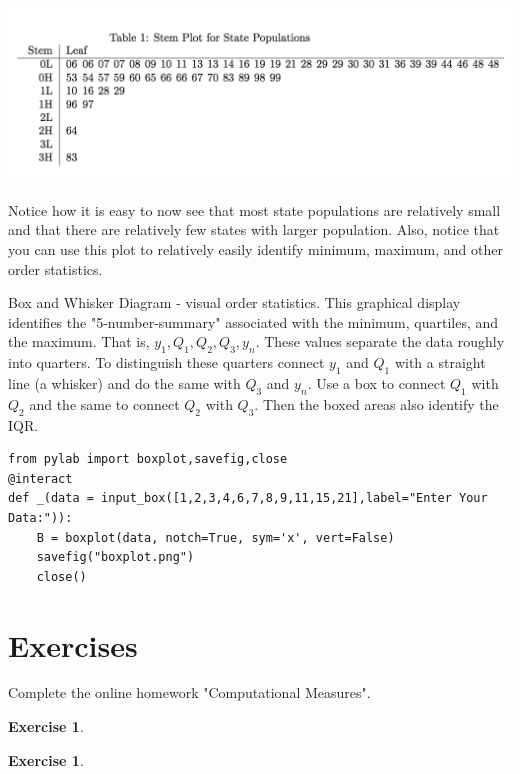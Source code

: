 \documentclass[10pt,]{book}
\theoremstyle{plain}
\theoremstyle{definition}
\theoremstyle{definition}
\theoremstyle{definition}
\newtheorem{exercise}[theorem]{Exercise}
\numberwithin{equation}{section}
\begin{document}
	
\includegraphics[width=1\linewidth]{images/stemandleaf.png}


Notice how it is easy to now see that most state populations are relatively small and that there are relatively few states with larger population. Also, notice that you can use this plot to relatively easily identify minimum, maximum, and other order statistics.		
		
\par
Box and Whisker Diagram - visual order statistics. This graphical display identifies the "5-number-summary" associated with the minimum, quartiles, and the maximum. That is, \(y_1, Q_1, Q_2, Q_3, y_n\).  These values separate the data roughly into quarters. To distinguish these quarters connect \(y_1\) and \(Q_1\) with a straight line (a whisker) and do the same with \(Q_3\) and \(y_n\). Use a box to connect \(Q_1\) with \(Q_2\) and the same to connect \(Q_2\) with \(Q_3\). Then the boxed areas also identify the IQR.    
\begin{lstlisting}[style=sageinput]
from pylab import boxplot,savefig,close
@interact
def _(data = input_box([1,2,3,4,6,7,8,9,11,15,21],label="Enter Your Data:")):
    B = boxplot(data, notch=True, sym='x', vert=False)
    savefig("boxplot.png")
    close()
\end{lstlisting}

\typeout{************************************************}
\typeout{************************************************}
\section[{Exercises}]{Exercises}\label{section-12}
Complete the online homework "Computational Measures".%
\begin{exercise}\label{exercise-3}
\end{exercise}
\begin{exercise}\label{exercise-4}
\end{exercise}
\typeout{************************************************}
\typeout{************************************************}
\end{document}
